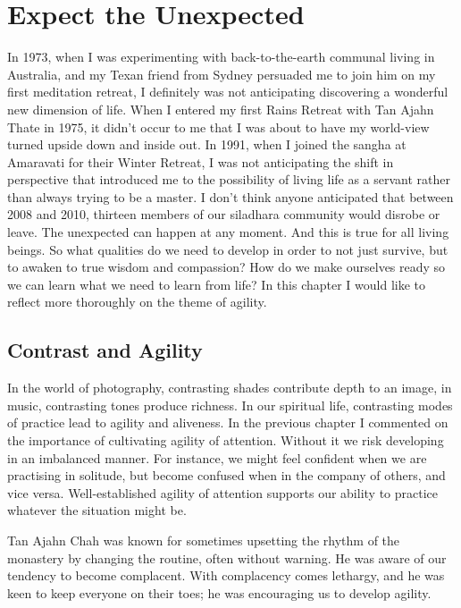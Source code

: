 \chapter{Expect the Unexpected}

In 1973, when I was experimenting with back-to-the-earth communal living
in Australia, and my Texan friend from Sydney persuaded me to join him
on my first meditation retreat, I definitely was not anticipating
discovering a wonderful new dimension of life. When I entered my first
Rains Retreat with Tan Ajahn Thate in 1975, it didn't occur to me that I
was about to have my world-view turned upside down and inside out. In
1991, when I joined the sangha at Amaravati for their Winter Retreat, I
was not anticipating the shift in perspective that introduced me to the
possibility of living life as a servant\cite{servant} rather than
always trying to be a master.
I don't think anyone anticipated that between 2008 and 2010, thirteen
members of our siladhara community would disrobe or leave. The
unexpected can happen at any moment. And this is true for all living
beings. So what qualities do we need to develop in order to not just
survive, but to awaken to true wisdom and compassion? How do we make
ourselves ready so we can learn what we need to learn from life? In this
chapter I would like to reflect more thoroughly on the theme of agility.

\section{Contrast and Agility}

In the world of photography, contrasting shades contribute depth to an
image, in music, contrasting tones produce richness. In our spiritual
life, contrasting modes of practice lead to agility and aliveness. In
the previous chapter I commented on the importance of cultivating
agility of attention. Without it we risk developing in an imbalanced
manner. For instance, we might feel confident when we are practising in
solitude, but become confused when in the company of others, and vice
versa. Well-established agility of attention supports our ability to
practice whatever the situation might be.

Tan Ajahn Chah was known for sometimes upsetting the rhythm of the
monastery by changing the routine, often without warning. He was aware
of our tendency to become complacent. With complacency comes lethargy,
and he was keen to keep everyone on their toes; he was encouraging us to
develop agility.

